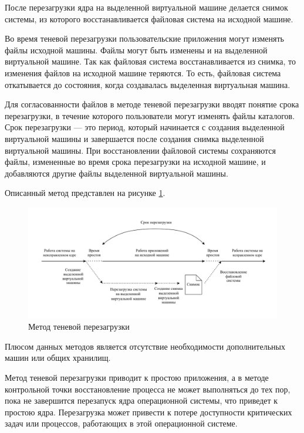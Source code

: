 После перезагрузки ядра на выделенной виртуальной машине делается снимок системы, из которого восстанавливается файловая система на исходной машине.

Во время теневой перезагрузки пользовательские приложения могут изменять файлы исходной машины. Файлы могут быть изменены и на выделенной виртуальной машине. Так как файловая система восстанавливается из снимка, то изменения файлов на исходной машине теряются. То есть, файловая система откатывается до состояния, когда создавалась выделенная виртуальная машина.

Для согласованности файлов в методе теневой перезагрузки вводят понятие срока перезагрузки, в течение которого пользователи могут изменять файлы каталогов. Срок перезагрузки --- это период, который начинается с создания выделенной виртуальной машины \cite{vm} и завершается после создания снимка выделенной виртуальной машины. При восстановлении файловой системы сохраняются файлы, измененные во время срока перезагрузки на исходной машине, и добавляются другие файлы выделенной виртуальной машины. 

Описанный метод представлен на рисунке \ref{img:shadow-reboot}.

\begin{figure}[H]
	\begin{center}
		\includegraphics[scale=0.7]{img/shadow-reboot.pdf}
	\end{center}
	\captionsetup{justification=centering}
	\caption{Метод теневой перезагрузки}
	\label{img:shadow-reboot}
\end{figure}

Плюсом данных методов является отсутствие необходимости дополнительных машин или общих хранилищ.

Метод теневой перезагрузки приводит к простою приложения, а в методе контрольной точки восстановление процесса не может выполняться до тех пор, пока не завершится перезапуск ядра операционной системы, что приведет к простою ядра. Перезагрузка может привести к потере доступности критических задач или процессов, работающих в этой операционной системе.

